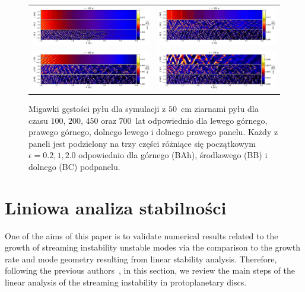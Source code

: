 \begin{figure}
   \centering
   \begin{tabular}{@{}cc@{}}
      \includegraphics[width=0.49\linewidth]{figures/fig1a} & 
      \includegraphics[width=0.49\linewidth]{figures/fig1b} \\
      \includegraphics[width=0.49\linewidth]{figures/fig1c} &
      \includegraphics[width=0.49\linewidth]{figures/fig1d}
   \end{tabular}
   \caption{Migawki gęstości pyłu dla symulacji z $50$~cm ziarnami pyłu
      dla czasu $100$, $200$, $450$ oraz $700$~lat odpowiednio dla lewego
      górnego, prawego górnego, dolnego lewego i dolnego prawego panelu.
      Każdy z paneli jest podzielony na trzy części różniące się początkowym 
      $\epsilon = 0.2, 1, 2.0$ odpowiednio dla górnego (BAh), środkowego (BB) i
      dolnego (BC) podpanelu.}
   \label{fig1}
\end{figure}
%
\section{Liniowa analiza stabilności}
\label{sec:lsa}
%
One of the aims of this paper is to validate numerical results related to the
growth of streaming instability unstable modes via the comparison to the growth
rate and mode geometry resulting from linear stability analysis. Therefore,
following the previous authors~\citep{YG05}, in this section, we review the main
steps of the linear analysis of the streaming instability in protoplanetary
discs.

